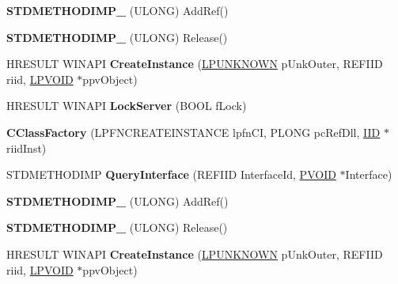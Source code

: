 \begin{DoxyCompactItemize}
{\bfseries S\+T\+D\+M\+E\+T\+H\+O\+D\+I\+M\+P\+\_\+} (U\+L\+O\+NG) Add\+Ref()
\item 
\mbox{\label{class_c_class_factory_ace20a6d5768cbf817b952ff32d0ec9e5}} 
{\bfseries S\+T\+D\+M\+E\+T\+H\+O\+D\+I\+M\+P\+\_\+} (U\+L\+O\+NG) Release()
\item 
\mbox{\label{class_c_class_factory_a3c4ccb9f496a79b2fd37418c928ada06}} 
H\+R\+E\+S\+U\+LT W\+I\+N\+A\+PI {\bfseries Create\+Instance} (\hyperlink{interface_i_unknown}{L\+P\+U\+N\+K\+N\+O\+WN} p\+Unk\+Outer, R\+E\+F\+I\+ID riid, \hyperlink{interfacevoid}{L\+P\+V\+O\+ID} $\ast$ppv\+Object)
\item 
\mbox{\label{class_c_class_factory_ab456aeb3f6ba2d246532a370b69ee471}} 
H\+R\+E\+S\+U\+LT W\+I\+N\+A\+PI {\bfseries Lock\+Server} (B\+O\+OL f\+Lock)
\item 
\mbox{\label{class_c_class_factory_ab0b65f2f3ae9421cc7a8d67962920bc5}} 
{\bfseries C\+Class\+Factory} (L\+P\+F\+N\+C\+R\+E\+A\+T\+E\+I\+N\+S\+T\+A\+N\+CE lpfn\+CI, P\+L\+O\+NG pc\+Ref\+Dll, \hyperlink{struct___i_i_d}{I\+ID} $\ast$riid\+Inst)
\item 
\mbox{\label{class_c_class_factory_a3521365dd055a10b8ff989c16a42bd8f}} 
S\+T\+D\+M\+E\+T\+H\+O\+D\+I\+MP {\bfseries Query\+Interface} (R\+E\+F\+I\+ID Interface\+Id, \hyperlink{interfacevoid}{P\+V\+O\+ID} $\ast$Interface)
\item 
\mbox{\label{class_c_class_factory_a769e4e226363663e0854552a3bda45cc}} 
{\bfseries S\+T\+D\+M\+E\+T\+H\+O\+D\+I\+M\+P\+\_\+} (U\+L\+O\+NG) Add\+Ref()
\item 
\mbox{\label{class_c_class_factory_ace20a6d5768cbf817b952ff32d0ec9e5}} 
{\bfseries S\+T\+D\+M\+E\+T\+H\+O\+D\+I\+M\+P\+\_\+} (U\+L\+O\+NG) Release()
\item 
\mbox{\label{class_c_class_factory_a3c4ccb9f496a79b2fd37418c928ada06}} 
H\+R\+E\+S\+U\+LT W\+I\+N\+A\+PI {\bfseries Create\+Instance} (\hyperlink{interface_i_unknown}{L\+P\+U\+N\+K\+N\+O\+WN} p\+Unk\+Outer, R\+E\+F\+I\+ID riid, \hyperlink{interfacevoid}{L\+P\+V\+O\+ID} $\ast$ppv\+Object)

\end{DoxyCompactItemize}
